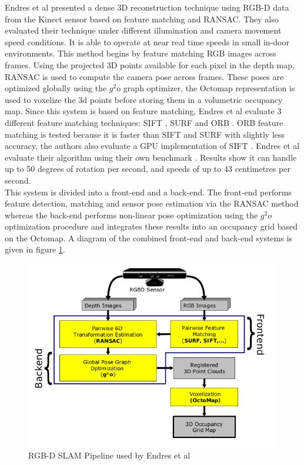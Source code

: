 Endres et al \cite{Endres12Evaluation} presented a dense 3D reconstruction technique using RGB-D data from the Kinect sensor based on feature matching and RANSAC. They also evaluated their technique under different illumination and camera movement speed conditions. It is able to operate at near real time speeds in small in-door environments. This method begins by feature matching RGB images across frames. Using the projected 3D points available for each pixel in the depth map, RANSAC \cite{Fischler81Random} is used to compute the camera pose across frames. These poses are optimized globally using the $g^2$o graph optimizer, the Octomap representation \cite{Wurm10Octomap} is used to voxelize the 3d points before storing them in a volumetric occupancy map. Since this system is based on feature matching, Endres et al evaluate 3 different feature matching techniques: SIFT \cite{Lowe04Distinctive} , SURF \cite{Bay06Surf,Bay08Speeded} and ORB \cite{Rublee11Orb}. ORB feature matching is tested because it is faster than SIFT and SURF with slightly less accuracy, the authors also evaluate a GPU implementation of SIFT \cite{Wu07Siftgpu}. Endres et al evaluate their algorithm using their own benchmark \cite{Sturm11Towards}. Results show it can handle up to 50 degrees of rotation per second, and speeds of up to 43 centimetres per second.  \\


This system is divided into a front-end and a back-end. The front-end performs feature detection, matching and sensor pose estimation via the RANSAC method whereas the back-end performs non-linear pose optimization using the $g^2o$ optimization procedure   and integrates these results into an occupancy grid based on the Octomap. A diagram of the combined front-end and back-end systems is given in figure \ref{Endres12EvaluationPipeline}. 


\begin{figure}[!h]
\centering
\includegraphics[width=12cm]{images/ch1/Endres12EvaluationPipeline}
\caption{RGB-D SLAM Pipeline used by Endres et al \cite{Endres12Evaluation}}
\label{Endres12EvaluationPipeline}
\end{figure}


